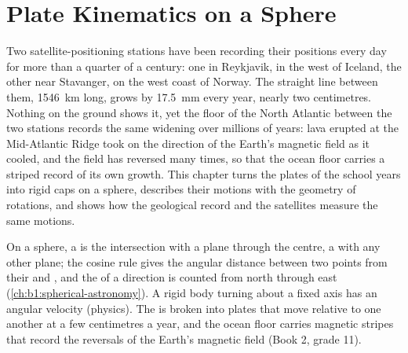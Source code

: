 \chapter{Plate Kinematics on a Sphere}\label{ch:b1:plate-kinematics}

Two satellite-positioning stations have been recording their positions every
day for more than a quarter of a century: one in Reykjavik, in the west of
Iceland, the other near Stavanger, on the west coast of Norway. The straight
line between them, \qty{1546}{km} long, grows by \qty{17.5}{mm} every year,
nearly two centimetres. Nothing on the ground shows it, yet the floor of the
North Atlantic between the two stations records the same widening over millions
of years: lava erupted at the Mid-Atlantic Ridge took on the direction of the
Earth's magnetic field as it cooled, and the field has reversed many times, so
that the ocean floor carries a striped record of its own growth. This chapter
turns the plates of the school years into rigid caps on a sphere, describes
their motions with the geometry of rotations, and shows how the geological
record and the satellites measure the same motions.

\begin{recall}
On a sphere, a  is the intersection with a plane through the
centre, a  with any other plane; the cosine rule gives the angular
distance between two points from their  and , and the
 of a direction is counted from north through east
(\cref{ch:b1:spherical-astronomy}). A rigid body turning about a fixed axis has
an angular velocity (physics). The  is broken into plates that move
relative to one another at a few centimetres a year, and the ocean floor
carries magnetic stripes that record the reversals of the Earth's magnetic
field (Book 2, grade 11).
\end{recall}

